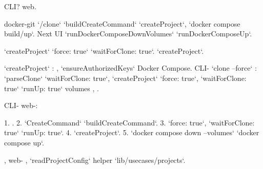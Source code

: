 \begin{decodedreasoningpanel}
    CLI?       web.

  docker-git  `/clone`  `buildCreateCommand`  `createProject`,    `docker compose build/up`.  Next UI     `runDockerComposeDownVolumes`  `runDockerComposeUp`.

    `createProject`  `force: true`  `waitForClone: true`.            `createProject`.

`createProject`    :   ,  `ensureAuthorizedKeys`   Docker Compose.  CLI- `clone --force`   : `parseClone`  `waitForClone: true`,  `createProject`  `force: true`, `waitForClone: true`  `runUp: true`  volumes    ,      .

    CLI-      web-:

1.    .
2.  `CreateCommand`  `buildCreateCommand`.
3.  `force: true`, `waitForClone: true`  `runUp: true`.
4.  `createProject`.
5.     `docker compose down --volumes`  `docker compose up`.

  ,   web-     ,   `readProjectConfig`   helper  `lib/usecases/projects`.
\end{decodedreasoningpanel}

